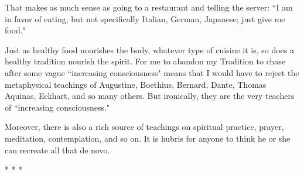 That makes as much sense as going to a restaurant and telling the server: ``I am in favor of eating, but not specifically Italian, German, Japanese; just give me food."

Just as healthy food nourishes the body, whatever type of cuisine it is, so does a healthy tradition nourish the spirit. For me to abandon my Tradition to chase after some vague ``increasing consciousness" means that I would have to reject the metaphysical teachings of Augustine, Boethius, Bernard, Dante, Thomas Aquinas, Eckhart, and so many others. But ironically, they are the very teachers of ``increasing consciousness."

Moreover, there is also a rich source of teachings on spiritual practice, prayer, meditation, contemplation, and so on. It is hubris for anyone to think he or she can recreate all that de novo.




\begin{center}* * *\end{center}


